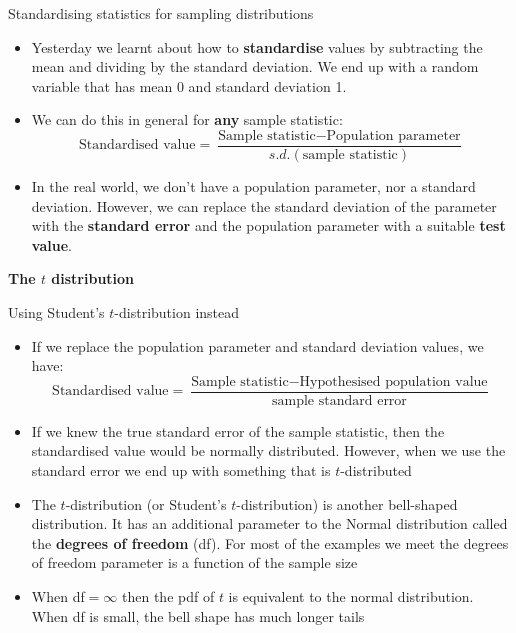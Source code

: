 \documentclass[12pt,xcolor=dvipsnames,handout,mathserif,aspectratio=169]{beamer}
\newcommand{\bbl}[1]{{\color{NavyBlue} \textbf{#1}}}
\newcommand{\bre}[1]{{\color{red} \textbf{#1}}}
\newcommand{\bgr}[1]{{\color{PineGreen} \textbf{#1}}}
\begin{document}
\begin{frame}{Standardising statistics for sampling distributions}

\begin{itemize}
\item Yesterday we learnt about how to \bgr{standardise} values by subtracting the mean and dividing by the standard deviation. We end up with a random variable that has mean 0 and standard deviation 1. 
\item We can do this in general for \bre{any} sample statistic: 
$$\mbox{Standardised value} = \frac{\mbox{Sample statistic}-\mbox{Population parameter}}{s.d.(\mbox{sample statistic})}$$
\item In the real world, we don't have a population parameter, nor a standard deviation. However, we can replace the standard deviation of the parameter with the \bre{standard error} and the population parameter with a suitable \bbl{test value}.
\end{itemize}
\end{frame}


\begin{frame}[fragile]{}
\bbl{\Huge The $t$ distribution}\\ 
\vspace{0.5cm}
\end{frame}


\begin{frame}{Using Student's $t$-distribution instead}

\begin{itemize}
\item If we replace the population parameter and standard deviation values, we have:
$$\mbox{Standardised value} = \frac{\mbox{Sample statistic}-\mbox{Hypothesised population value}}{\mbox{sample standard error}}$$
\item If we knew the true standard error of the sample statistic, then the standardised value would be normally distributed. However, when we use the standard error we end up with something that is $t$-distributed
\item The $t$-distribution (or Student's $t$-distribution) is another bell-shaped distribution. It has an additional parameter to the Normal distribution called the \bre{degrees of freedom} (df). For most of the examples we meet the degrees of freedom parameter is a function of the sample size
\item When df$=\infty$ then the pdf of $t$ is equivalent to the normal distribution. When df is small, the bell shape has much longer tails
\end{itemize}
\end{frame}
\end{document}
